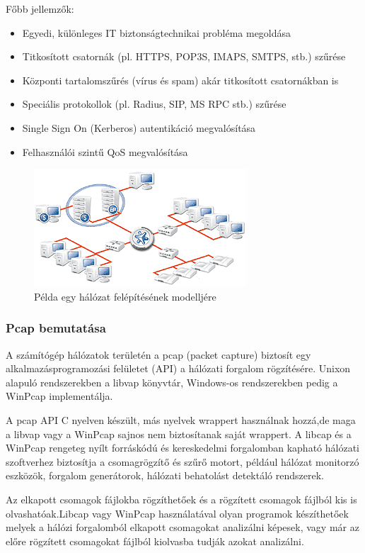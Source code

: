 \documentclass[a4paper,12pt,oneside]{report}
\begin{document}
Főbb jellemzők:

\begin{itemize}
	\itemsep0em
	\item Egyedi, különleges IT biztonságtechnikai probléma megoldása 
	\item Titkosított csatornák (pl. HTTPS, POP3S, IMAPS, SMTPS, stb.) szűrése 
	\item Központi tartalomszűrés (vírus és spam) akár titkosított csatornákban is 
	\item Speciális protokollok (pl. Radius, SIP, MS RPC stb.) szűrése 
	\item Single Sign On (Kerberos) autentikáció megvalósítása 
	\item Felhasználói szintű QoS megvalósítása
\end{itemize}


\begin{figure}[h]
  \includegraphics{zorp.png}
  \caption{Példa egy hálózat felépítésének modelljére}
  \label{fig:zorp}
\end{figure}

\subsubsection{Pcap bemutatása}

A számítógép hálózatok területén a pcap (packet capture) biztosít egy 
alkalmazásprogramozási felületet (API) a hálózati forgalom rögzítésére.
Unixon alapuló rendszerekben a libvap könyvtár, Windows-os rendszerekben 
pedig a WinPcap implementálja.

A pcap API C nyelven készült, más nyelvek wrappert használnak hozzá,de maga
a libvap vagy a WinPcap sajnos nem biztosítanak saját wrappert.
A libcap és a WinPcap rengeteg nyílt forráskódú és kereskedelmi forgalomban 
kapható hálózati szoftverhez biztosítja a csomagrögzítő és szűrő motort, például 
hálózat monitorzó eszközök, forgalom generátorok, hálózati behatolást detektáló 
rendszerek.

Az elkapott csomagok fájlokba rögzíthetőek és a rögzített csomagok fájlból kis is 
olvashatóak.Libcap vagy WinPcap használatával olyan programok készíthetőek melyek a 
hálózi forgalomból elkapott csomagokat analizálni képesek, vagy már az előre 
rögzített csomagokat fájlból kiolvasba tudják azokat analizálni.
\end{document}
